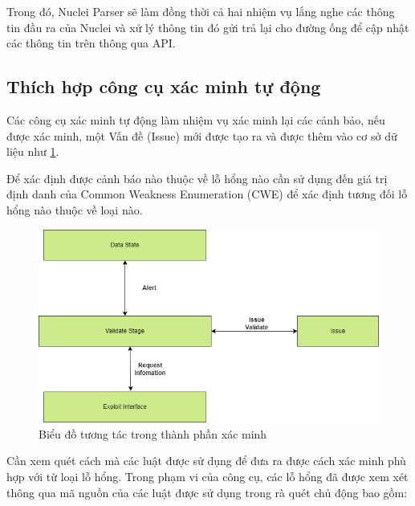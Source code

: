 \documentclass[./../main.tex]{subfiles}
\begin{document}
Trong đó, Nuclei Parser sẽ làm đồng thời cả hai nhiệm vụ
lắng nghe các thông tin đầu ra của Nuclei và xử lý thông tin đó gửi trả
lại cho đường ống để cập nhật các thông tin trên thông qua API.

\subsection{Thích hợp công cụ xác minh tự động}

Các công cụ xác minh tự động làm nhiệm vụ xác minh lại các cảnh bảo,
nếu được xác minh, một Vấn đề (Issue) mới được tạo ra và được thêm vào cơ sở dữ
liệu như \ref{fig:validate_stage}.

Để xác định được cảnh báo nào thuộc về lỗ hổng nào cần sử dụng đến
giá trị định danh của Common Weakness Enumeration (CWE) để xác định
tương đối lỗ hổng nào thuộc về loại nào.

\begin{figure}[ht!]
	\includegraphics[width=\linewidth]{./images/validate_stage.png}
	\caption{Biểu đồ tương tác trong thành phần xác minh}
	\label{fig:validate_stage}
\end{figure}

Cần xem quét cách mà các luật được sử dụng để đưa ra được cách xác minh phù
hợp với từ loại lỗ hổng. Trong phạm vi của công cụ, các lỗ hổng đã được
xem xét thông qua mã nguồn của các luật được sử dụng trong rà quét chủ động
bao gồm:
\end{document}
